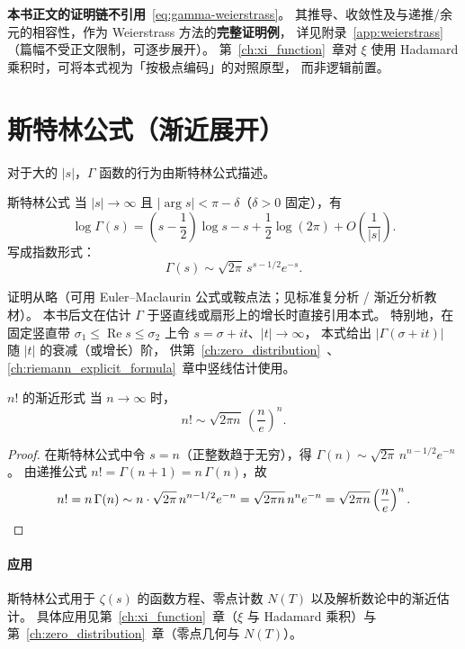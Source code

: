 \textbf{本书正文的证明链不引用}~\eqref{eq:gamma-weierstrass}。
其推导、收敛性及与递推/余元的相容性，作为 Weierstrass 方法的\textbf{完整证明例}，
详见附录~\ref{app:weierstrass}（篇幅不受正文限制，可逐步展开）。
第~\ref{ch:xi_function}~章对 $\xi$ 使用 Hadamard 乘积时，可将本式视为「按极点编码」的对照原型，
而非逻辑前置。

\section{斯特林公式（渐近展开）}\label{sec:stirling}

对于大的 $|s|$，$\Gamma$ 函数的行为由斯特林公式描述。

\begin{theorem}{斯特林公式}{}\label{thm:stirling}
当 $|s| \to \infty$ 且 $|\arg s| < \pi - \delta$（$\delta > 0$ 固定），有
\[
\log \Gamma(s) = \left(s - \frac{1}{2}\right)\log s - s + \frac{1}{2}\log(2\pi) + O\!\left(\frac{1}{|s|}\right).
\]
写成指数形式：
\[
\Gamma(s) \sim \sqrt{2\pi} \, s^{s-1/2} e^{-s}.
\]
\end{theorem}

证明从略（可用 Euler--Maclaurin 公式或鞍点法；见标准复分析 / 渐近分析教材）。
本书后文在估计 $\Gamma$ 于竖直线或扇形上的增长时直接引用本式。
特别地，在固定竖直带 $\sigma_1\le\operatorname{Re}s\le\sigma_2$ 上令 $s=\sigma+it$、$|t|\to\infty$，
本式给出 $|\Gamma(\sigma+it)|$ 随 $|t|$ 的衰减（或增长）阶，
供第~\ref{ch:zero_distribution}~、\ref{ch:riemann_explicit_formula}~章中竖线估计使用。

\begin{corollary}{$n!$ 的渐近形式}{}\label{cor:stirling-factorial}
当 $n \to \infty$ 时，
\[
n! \sim \sqrt{2\pi n} \, \left(\frac{n}{e}\right)^n.
\]
\end{corollary}

\begin{proof}
在斯特林公式中令 $s = n$（正整数趋于无穷），得
$\Gamma(n) \sim \sqrt{2\pi}\,n^{n-1/2}e^{-n}$。
由递推公式 $n! = \Gamma(n+1) = n\,\Gamma(n)$，故
\[
n! = n\,\Gamma(n) \sim n \cdot \sqrt{2\pi}\,n^{n-1/2}e^{-n}
= \sqrt{2\pi n}\,n^n e^{-n} = \sqrt{2\pi n}\left(\frac{n}{e}\right)^n. \qedhere
\]
\end{proof}


\paragraph{应用}
斯特林公式用于 $\zeta(s)$ 的函数方程、零点计数 $N(T)$ 以及解析数论中的渐近估计。
具体应用见第~\ref{ch:xi_function}~章（$\xi$ 与 Hadamard 乘积）与第~\ref{ch:zero_distribution}~章（零点几何与 $N(T)$）。


